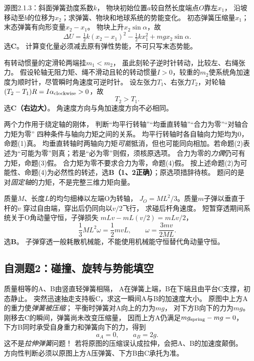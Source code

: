 \problemtext 源图2.1.3：斜面弹簧劲度系数$k$，
物块初始位置$a$较自然长度端点$O$靠左$x_1$，
沿坡移动至$b$的位移为$x_2$；求弹簧、物块和地球系统的势能变化。
\workings
初态弹簧压缩量$x_1$；末态弹簧有向形变量$x_2-x_1$。
物块上升$x_2\sin\alpha$，故
\[
\boxed{\Delta U
=\tfrac12 k(x_2-x_1)^2-\tfrac12kx_1^2
+mgx_2\sin\alpha}.
\]
选\textbf{C}。
\crosscheck 计算变化量必须减去原有弹性势能，不可只写末态势能。

\problemtext 有转动惯量的定滑轮两端挂$m_1<m_2$，
虽此刻轮子逆时针转动，比较左、右绳张力。
\workings
假设轮轴无阻力矩、绳不滑动且轮的转动惯量$I>0$，较重的$m_2$使系统角加速度为顺时针，尽管瞬时角速度可逆时针。
设左张力$T_1$、右张力$T_2$，对轮轴
$(T_2-T_1)R=I\alpha_{\rm clockwise}>0$，故
\[
\boxed{T_2>T_1}.
\]
选\textbf{C（右边大）}。
\crosscheck 角速度方向与角加速度方向不必相同。

\problemtext 两个力作用于绕定轴的刚体，
判断“均平行转轴”“均垂直转轴”“合力为零”“对轴合力矩为零”
四种条件与轴向力矩之间的关系。
\workings
均平行转轴时各自轴向力矩均为0，命题(1)真。
均垂直转轴时两轴向力矩\emph{可能}抵消，但也可能同向相加。若命题(2)表述为“可能为零”则真；若是“必为零”则假，须核原选项。
合力为零的\emph{力偶}仍可有力矩，命题(3)假。
合力矩为零不要求合力为零，命题(4)假。
按上述命题(2)为可能性、命题(4)为必然性的转述，选\textbf{B（1、2正确）}；原选项措辞待核。
\crosscheck 题问的是对\emph{固定轴}的力矩，不是完整三维力矩向量。

\problemtext 质量$M$、长度$L$的均匀细棒以左端O为转轴，
$J_O=ML^2/3$。质量$m$子弹以垂直于杆的$v$
穿过自由端，穿出后仍同向以$v/2$飞行，
求碰后杆角速度。
\workings
短暂穿透期间系统关于O角动量守恒，子弹损失
$mLv-mL(v/2)=mLv/2$，
\[
\frac13ML^2\omega=\frac12mvL,
\qquad
\boxed{\omega=\frac{3mv}{2ML}}.
\]
选\textbf{B}。
\crosscheck 子弹穿透一般耗散机械能，不能使用机械能守恒替代角动量守恒。

\subsection{自测题2：碰撞、旋转与势能填空}

\problemtext 质量相等的A、B由竖直轻弹簧相隔，
A在弹簧上端，B在下端且由平台C支撑，初态静止。
突然迅速抽走支持板C，求这一瞬间A与B的加速度大小。
\workings
原图中上方A的重力使\emph{弹簧被压缩}；
平衡时弹簧对A向上的力为$mg$，
对下方B向下的力为$mg$。
刚移去C的瞬间，弹簧尚未改变压缩量，
因而上方A仍满足$mg_{\rm spring}-mg=0$，
下方B同时承受自身重力和弹簧向下的力，得到
\[
\boxed{a_A=0},\qquad \boxed{a_B=2g}.
\]
\crosscheck 这不是\emph{拉伸弹簧}问题！
若将原图的压缩误认成拉伸，会把A、B的加速度颠倒。
方向性判断必须以原图上方A压弹簧、下方B由C承托为准。

